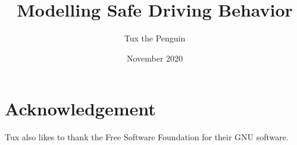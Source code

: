 \documentclass{article}
\title{Modelling Safe Driving Behavior}
\author{Tux the Penguin}
\date{November 2020}
\begin{document}
\maketitle










\section*{Acknowledgement}

Tux also likes to thank the Free Software Foundation for their GNU software.



\end{document}
